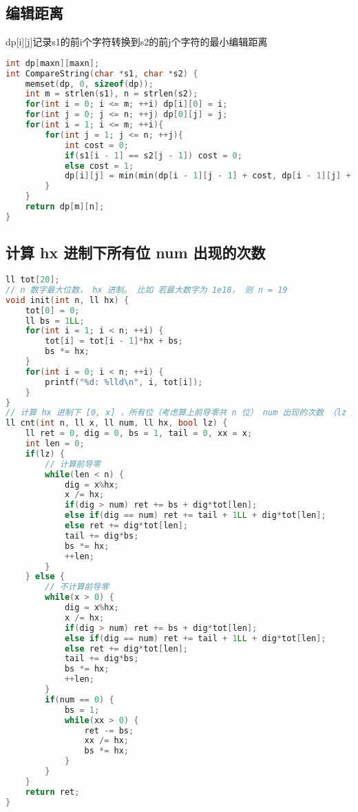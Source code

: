 \subsection{编辑距离}

dp[i][j]记录s1的前i个字符转换到s2的前j个字符的最小编辑距离

\begin{lstlisting}[language=C++]
int dp[maxn][maxn];
int CompareString(char *s1, char *s2) {
    memset(dp, 0, sizeof(dp));
    int m = strlen(s1), n = strlen(s2);
    for(int i = 0; i <= m; ++i) dp[i][0] = i;
    for(int j = 0; j <= n; ++j) dp[0][j] = j;
    for(int i = 1; i <= m; ++i){
        for(int j = 1; j <= n; ++j){
            int cost = 0;
            if(s1[i - 1] == s2[j - 1]) cost = 0;
            else cost = 1;
            dp[i][j] = min(min(dp[i - 1][j - 1] + cost, dp[i - 1][j] + 1), dp[i][j - 1] + 1);
        }
    }
    return dp[m][n];
}    
\end{lstlisting}

\subsection{计算 hx 进制下所有位 num 出现的次数}

\begin{lstlisting}[language=C++]
ll tot[20];
// n 数字最大位数， hx 进制。 比如 若最大数字为 1e18， 则 n = 19
void init(int n, ll hx) {
    tot[0] = 0;
    ll bs = 1LL;
    for(int i = 1; i < n; ++i) {
        tot[i] = tot[i - 1]*hx + bs;
        bs *= hx;
    }
    for(int i = 0; i < n; ++i) {
        printf("%d: %lld\n", i, tot[i]);
    }
}
// 计算 hx 进制下 [0, x] ，所有位（考虑算上前导零共 n 位） num 出现的次数 （lz 为是否考虑前导零）
ll cnt(int n, ll x, ll num, ll hx, bool lz) {
    ll ret = 0, dig = 0, bs = 1, tail = 0, xx = x;
    int len = 0;
    if(lz) {
        // 计算前导零
        while(len < n) {
            dig = x%hx;
            x /= hx;
            if(dig > num) ret += bs + dig*tot[len];
            else if(dig == num) ret += tail + 1LL + dig*tot[len];
            else ret += dig*tot[len];
            tail += dig*bs;
            bs *= hx;
            ++len;
        }
    } else {
        // 不计算前导零
        while(x > 0) {
            dig = x%hx;
            x /= hx;
            if(dig > num) ret += bs + dig*tot[len];
            else if(dig == num) ret += tail + 1LL + dig*tot[len];
            else ret += dig*tot[len];
            tail += dig*bs;
            bs *= hx;
            ++len;
        }
        if(num == 0) {
            bs = 1;
            while(xx > 0) {
                ret -= bs;
                xx /= hx;
                bs *= hx;
            }
        }
    }
    return ret;
} 
\end{lstlisting}

